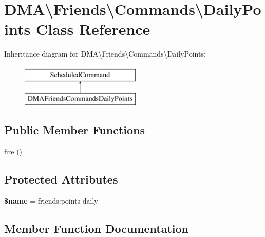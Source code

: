 \hypertarget{classDMA_1_1Friends_1_1Commands_1_1DailyPoints}{}\section{D\+M\+A\textbackslash{}Friends\textbackslash{}Commands\textbackslash{}Daily\+Points Class Reference}
\label{classDMA_1_1Friends_1_1Commands_1_1DailyPoints}
Inheritance diagram for D\+M\+A\textbackslash{}Friends\textbackslash{}Commands\textbackslash{}Daily\+Points\+:\begin{figure}[H]
\begin{center}
\leavevmode
\includegraphics[height=2.000000cm]{da/d3a/classDMA_1_1Friends_1_1Commands_1_1DailyPoints}
\end{center}
\end{figure}
\subsection*{Public Member Functions}
\begin{DoxyCompactItemize}
\item 
\hyperlink{classDMA_1_1Friends_1_1Commands_1_1DailyPoints_a744a2cce8db836d1e2ae4db904361b1e}{fire} ()
\end{DoxyCompactItemize}
\subsection*{Protected Attributes}
\begin{DoxyCompactItemize}
\item 
\hypertarget{classDMA_1_1Friends_1_1Commands_1_1DailyPoints_affe8b91e4538363d05401b06b59ec6b0}{}{\bfseries \$name} = \textquotesingle{}friends\+:points-\/daily\textquotesingle{}\label{classDMA_1_1Friends_1_1Commands_1_1DailyPoints_affe8b91e4538363d05401b06b59ec6b0}

\end{DoxyCompactItemize}


\subsection{Member Function Documentation}
\hypertarget{classDMA_1_1Friends_1_1Commands_1_1DailyPoints_a744a2cce8db836d1e2ae4db904361b1e}{}
